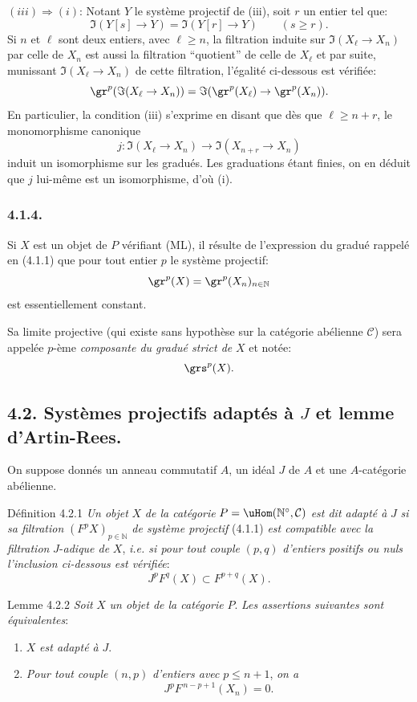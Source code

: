 $(iii)\Rightarrow(i)$: Notant $Y$ le système projectif de (iii), soit $r$ un entier tel que:
\[
\Im(Y[s]\to Y)=\Im(Y[r]\to Y)\qquad(s\ge r).
\]
Si $n$ et $\ell$ sont deux entiers, avec $\ell\ge n$, la filtration induite sur $\Im(X_\ell\to X_n)$ par celle de $X_n$ est aussi la filtration ``quotient'' de celle de $X_\ell$ et par suite, munissant $\Im(X_\ell\to X_n)$ de cette filtration, l'égalité ci-dessous est vérifiée:
\[
\gr^p(\Im(X_\ell\to X_n))=
\Im(\gr^p(X_\ell)\to\gr^p(X_n)).
\]
En particulier, la condition (iii) s'exprime en disant que dès que $\ell\ge n+r$, le monomorphisme canonique
\[
j:\Im(X_\ell\to X_n)\longrightarrow\Im(X_{n+r}\to X_n)
\]
induit un isomorphisme sur les gradués. Les graduations étant finies, on en déduit que $j$ lui-même est un isomorphisme, d'où (i).


\subsubsection*{4.1.4.}
Si $X$ est un
objet de \(P\) vérifiant (ML), il résulte de l'expression du gradué rappelé en (4.1.1) que pour tout entier \(p\) le système projectif:
\[
\gr^p(X)=\gr^p(X_n)_{n\in\mathbb{N}}
\]
est essentiellement constant.

Sa limite projective (qui existe sans hypothèse sur la catégorie abélienne \(\mathcal{C}\)) sera appelée \(p\)-ème \emph{composante du gradué strict de} \(X\) et notée:
\[
\grs^p(X).
\]

\subsection*{4.2. Systèmes projectifs adaptés à \(J\) et lemme d'Artin-Rees.}

On suppose donnés un anneau commutatif \(A\), un idéal \(J\) de \(A\) et une \(A\)-catégorie abélienne.

\begin{statement}{Définition 4.2.1}
\emph{Un objet} \(X\) \emph{de la catégorie} \(P=\uHom(\mathbb{N}^\circ,\mathcal{C})\) \emph{est dit adapté à} \(J\) \emph{si sa filtration} \((F^pX)_{p\in\mathbb{N}}\) \emph{de système projectif} (4.1.1) \emph{est compatible avec la filtration} \(J\)-\emph{adique de} \(X\), \emph{i.e. si pour tout couple} \((p,q)\) \emph{d'entiers positifs ou nuls l'inclusion ci-dessous est vérifiée}:
\[
J^pF^q(X)\subset F^{p+q}(X).
\]
\end{statement}

\begin{statement}{Lemme 4.2.2}
\emph{Soit} \(X\) \emph{un objet de la catégorie} \(P\). \emph{Les assertions suivantes sont équivalentes}:
\begin{enumerate}[label=\textup{(\roman*)}]
\item \(X\) \emph{est adapté à} \(J\).
\item \emph{Pour tout couple} \((n,p)\) \emph{d'entiers avec} \(p\le n+1\), \emph{on a}
\[
J^pF^{\,n-p+1}(X_n)=0 .
\]
\end{enumerate}
\end{statement}

